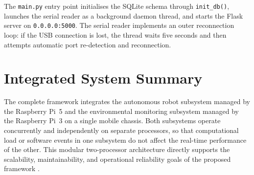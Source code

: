 The \texttt{main.py} entry point initialises the SQLite schema through
\texttt{init\_db()}, launches the serial reader as a background daemon
thread, and starts the Flask server on \texttt{0.0.0.0:5000}. The
serial reader implements an outer reconnection loop: if the USB
connection is lost, the thread waits five seconds and then attempts
automatic port re-detection and reconnection.

\section{Integrated System Summary}

The complete framework integrates the autonomous robot subsystem managed
by the Raspberry Pi~5 and the environmental monitoring subsystem managed
by the Raspberry Pi~3 on a single mobile chassis. Both subsystems
operate concurrently and independently on separate processors, so that
computational load or software events in one subsystem do not affect
the real-time performance of the other. This modular two-processor
architecture directly supports the scalability, maintainability, and
operational reliability goals of the proposed framework
\cite{r23,r26,r29}.